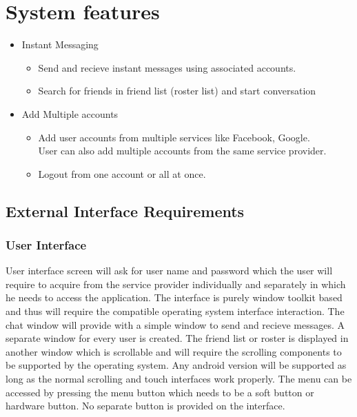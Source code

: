 \documentclass{SureshLimkar}
\begin{document}
\section{System features}
\begin{itemize}
	\item Instant Messaging
		\begin{itemize}
			\item Send and recieve instant messages using associated accounts.
			\item Search for friends in friend list (roster list) and start conversation
		
		\end{itemize}
		\item Add Multiple accounts
		\begin{itemize}
			\item Add user accounts from multiple services like Facebook, Google. \\ User can also add multiple accounts from the same service provider.
			\item Logout from one account or all at once.
			
		\end{itemize}
\end{itemize}

\subsection{External Interface Requirements}
\subsubsection{User Interface}
\hspace{0.5 in}User interface screen will ask for user name and password which the user will require to acquire from the service provider individually and separately in which he needs to access the application.
The interface is purely window toolkit based and thus will require the compatible operating system interface interaction. The chat window will provide with a simple window to send and recieve messages. A separate window for every user is created. The friend list or roster is displayed in another window which is scrollable and will require the scrolling components to be supported by the operating system.
\hspace{0.5 in}Any android version will be supported as long as the normal scrolling and touch interfaces work properly. The menu can be accessed by pressing the menu button which needs to be a soft button or hardware button. No separate button is provided on the interface. 
\end{document}
